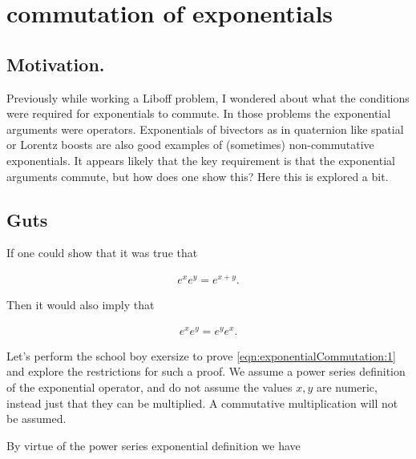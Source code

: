 
%

\chapter{commutation of exponentials}
\label{chap:exponentialCommutation}
{}
\date{May 30, 2010}

\beginArtNoToc

\section{Motivation.}

Previously while working a Liboff problem, I wondered about what the conditions were required for exponentials to commute.  In those problems the exponential arguments were operators.  Exponentials of bivectors as in quaternion like spatial or Lorentz boosts are also good examples of (sometimes) non-commutative exponentials.  It appears likely that the key requirement is that the exponential arguments commute, but how does one show this?  Here this is explored a bit.

\section{Guts}

If one could show that it was true that

\begin{align}\label{eqn:exponentialCommutation:1}
e^{x} e^{y} = e^{x + y}.
\end{align}

Then it would also imply that 

\begin{align}\label{eqn:exponentialCommutation:2}
e^{x} e^{y} = e^{y} e^{x}.
\end{align}

Let's perform the school boy exersize to prove \ref{eqn:exponentialCommutation:1} and explore the restrictions for such a proof.  We assume a power series definition of the exponential operator, and do not assume the values $x,y$ are numeric, instead just that they can be multiplied.  A commutative multiplication will not be assumed.

By virtue of the power series exponential definition we have

